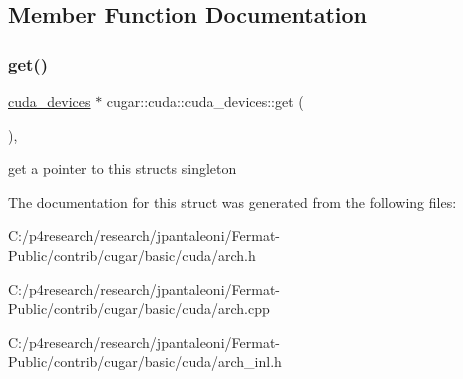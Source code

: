 \subsection{Member Function Documentation}
\mbox{\label{structcugar_1_1cuda_1_1cuda__devices_ab146b0ff61956367c2338f0e3a31f3ec}} 
\subsubsection{\texorpdfstring{get()}{get()}}
{\footnotesize\ttfamily \hyperlink{structcugar_1_1cuda_1_1cuda__devices}{cuda\+\_\+devices} $\ast$ cugar\+::cuda\+::cuda\+\_\+devices\+::get (\begin{DoxyParamCaption}{ }\end{DoxyParamCaption})\hspace{0.3cm}{\ttfamily [inline]}, {\ttfamily [static]}}

get a pointer to this struct\textquotesingle{}s singleton 

The documentation for this struct was generated from the following files\+:\begin{DoxyCompactItemize}
\item 
C\+:/p4research/research/jpantaleoni/\+Fermat-\/\+Public/contrib/cugar/basic/cuda/arch.\+h\item 
C\+:/p4research/research/jpantaleoni/\+Fermat-\/\+Public/contrib/cugar/basic/cuda/arch.\+cpp\item 
C\+:/p4research/research/jpantaleoni/\+Fermat-\/\+Public/contrib/cugar/basic/cuda/arch\+\_\+inl.\+h\end{DoxyCompactItemize}
